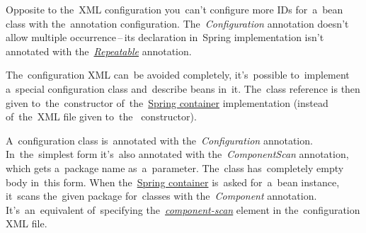 \warning Opposite to the~XML configuration you~can't configure more IDs for~a~bean class with the~annotation configuration.
The~\textit{Configuration} annotation doesn't allow multiple occurrence\,--\,its declaration in~Spring implementation isn't annotated with the~\hyperref[annotationsrepeatable]{\textit{Repeatable}} annotation.
\newpage

\label{iocnoxml}
The~configuration XML can~be avoided completely, it's~possible to~implement a~special configuration class and~describe beans in~it.
The~class reference is then given to~the~constructor of~the~\hyperref[springcontainrer]{Spring container} implementation  (instead of~the~XML file given to~the~ constructor).

A~configuration class is~annotated with the~\textit{Configuration} annotation.
In~the~simplest form it's~also annotated with the~\textit{ComponentScan} annotation, which gets a~package name as~a~parameter.
The~class has~completely empty body in~this form.
When the~\hyperref[springcontainrer]{Spring container} is~asked for~a~bean instance, it~scans the~given package for~classes with the~\textit{Component} annotation.
It's~an~equivalent of~specifying the~\hyperref[iocannotations]{\textit{component-scan}} element in the~configuration XML file.\\

